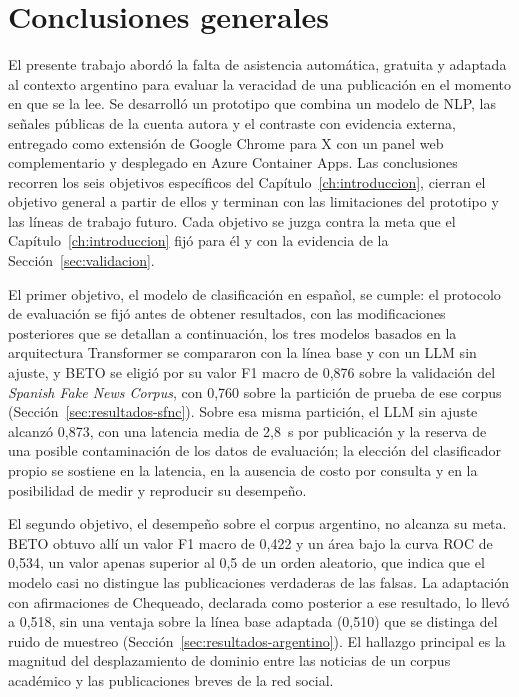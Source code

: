 \chapter{Conclusiones generales}\label{ch:conclusion}

El presente trabajo abordó la falta de asistencia automática, gratuita y adaptada al contexto argentino para evaluar la veracidad de una publicación en el momento en que se la lee. Se desarrolló un prototipo que combina un modelo de NLP, las señales públicas de la cuenta autora y el contraste con evidencia externa, entregado como extensión de Google Chrome para X con un panel web complementario y desplegado en Azure Container Apps. Las conclusiones recorren los seis objetivos específicos del Capítulo~\ref{ch:introduccion}, cierran el objetivo general a partir de ellos y terminan con las limitaciones del prototipo y las líneas de trabajo futuro. Cada objetivo se juzga contra la meta que el Capítulo~\ref{ch:introduccion} fijó para él y con la evidencia de la Sección~\ref{sec:validacion}.

El primer objetivo, el modelo de clasificación en español, se cumple: el protocolo de evaluación se fijó antes de obtener resultados, con las modificaciones posteriores que se detallan a continuación, los tres modelos basados en la arquitectura Transformer se compararon con la línea base y con un LLM sin ajuste, y BETO se eligió por su valor F1 macro de 0,876 sobre la validación del \textit{Spanish Fake News Corpus}, con 0,760 sobre la partición de prueba de ese corpus (Sección~\ref{sec:resultados-sfnc}). Sobre esa misma partición, el LLM sin ajuste alcanzó 0,873, con una latencia media de 2,8~s por publicación y la reserva de una posible contaminación de los datos de evaluación; la elección del clasificador propio se sostiene en la latencia, en la ausencia de costo por consulta y en la posibilidad de medir y reproducir su desempeño.

El segundo objetivo, el desempeño sobre el corpus argentino, no alcanza su meta. BETO obtuvo allí un valor F1 macro de 0,422 y un área bajo la curva ROC de 0,534, un valor apenas superior al 0,5 de un orden aleatorio, que indica que el modelo casi no distingue las publicaciones verdaderas de las falsas. La adaptación con afirmaciones de Chequeado, declarada como posterior a ese resultado, lo llevó a 0,518, sin una ventaja sobre la línea base adaptada (0,510) que se distinga del ruido de muestreo (Sección~\ref{sec:resultados-argentino}). El hallazgo principal es la magnitud del desplazamiento de dominio entre las noticias de un corpus académico y las publicaciones breves de la red social.

